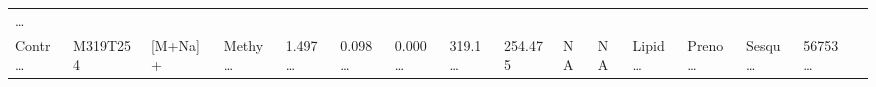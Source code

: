\documentclass[
]{article}
\begin{document}
\begin{longtable}[]{@{}llllllllllllllll@{}}
\begin{minipage}[t]{0.02\columnwidth}
\ldots{}\strut
\end{minipage}\tabularnewline
\begin{minipage}[t]{0.04\columnwidth}\raggedright
Contr\ldots{}\strut
\end{minipage} & \begin{minipage}[t]{0.04\columnwidth}\raggedright
M319T254\strut
\end{minipage} & \begin{minipage}[t]{0.04\columnwidth}\raggedright
{[}M+Na{]}+\strut
\end{minipage} & \begin{minipage}[t]{0.04\columnwidth}\raggedright
Methy\ldots{}\strut
\end{minipage} & \begin{minipage}[t]{0.04\columnwidth}\raggedright
1.497\ldots{}\strut
\end{minipage} & \begin{minipage}[t]{0.04\columnwidth}\raggedright
0.098\ldots{}\strut
\end{minipage} & \begin{minipage}[t]{0.04\columnwidth}\raggedright
0.000\ldots{}\strut
\end{minipage} & \begin{minipage}[t]{0.04\columnwidth}\raggedright
319.1\ldots{}\strut
\end{minipage} & \begin{minipage}[t]{0.04\columnwidth}\raggedright
254.475\strut
\end{minipage} & \begin{minipage}[t]{0.04\columnwidth}\raggedright
NA\strut
\end{minipage} & \begin{minipage}[t]{0.03\columnwidth}\raggedright
NA\strut
\end{minipage} & \begin{minipage}[t]{0.04\columnwidth}\raggedright
Lipid\ldots{}\strut
\end{minipage} & \begin{minipage}[t]{0.04\columnwidth}\raggedright
Preno\ldots{}\strut
\end{minipage} & \begin{minipage}[t]{0.04\columnwidth}\raggedright
Sesqu\ldots{}\strut
\end{minipage} & \begin{minipage}[t]{0.04\columnwidth}\raggedright
56753\ldots{}\strut
\end{minipage} & \begin{minipage}[t]{0.02\columnwidth}\raggedright

\end{minipage}
\end{longtable}
\end{document}
